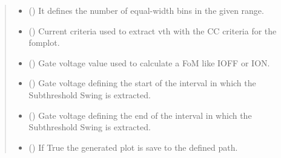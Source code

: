 \documentclass[letterpaper,10pt,english,openany, oneside]{sphinxmanual}
\begin{document}
\begin{fulllineitems}
\begin{quote}
\begin{description}
\begin{itemize}
\item {} 
 () \textendash{} It defines the number of equal-width bins in the given range.

\item {} 
 () \textendash{} Current criteria used to extract vth with the CC criteria for the fomplot.

\item {} 
 () \textendash{} Gate voltage value used to calculate a FoM like IOFF or ION.

\item {} 
 () \textendash{} Gate voltage defining the start of the interval in which the Subthreshold Swing is extracted.

\item {} 
 () \textendash{} Gate voltage defining the end of the interval in which the Subthreshold Swing is extracted.

\item {} 
 () \textendash{} If True the generated plot is save to the defined path.

\end{itemize}

\end{description}\end{quote}

\end{fulllineitems}

\end{document}

